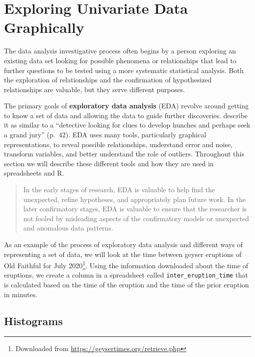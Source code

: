 \documentclass[
]{book}
\let\stdsection\section
\renewcommand\section{\newpage\stdsection}
\theoremstyle{definition}
\theoremstyle{definition}
\theoremstyle{definition}
\theoremstyle{definition}
\theoremstyle{remark}
\begin{document}
\hypertarget{exploring-univariate-data-graphically}{%
\section{Exploring Univariate Data Graphically}\label{exploring-univariate-data-graphically}}

The data analysis investigative process often begins by a person exploring an existing data set looking for possible phenomena or relationships that lead to further questions to be tested using a more systematic statistical analysis. Both the exploration of relationships and the confirmation of hypothesized relationships are valuable, but they serve different purposes.

The primary goals of \textbf{exploratory data analysis} (EDA) revolve around getting to know a set of data and allowing the data to guide further discoveries. \citet{EDA2003} describe it as similar to a ``detective looking for clues to develop hunches and perhaps seek a grand jury'' (p.~42). EDA uses many tools, particularly graphical representations, to reveal possible relationships, understand error and noise, transform variables, and better understand the role of outliers. Throughout this section we will describe these different tools and how they are used in spreadsheets and R.

\begin{quote}
In the early stages of research, EDA is valuable to help find the unexpected, refine hypotheses, and appropriately plan future work. In the later confirmatory stages, EDA is valuable to ensure that the researcher is not fooled by misleading aspects of the confirmatory models or unexpected and anomalous data patterns. \citep[p.~60]{EDA2003}
\end{quote}

As an example of the process of exploratory data analysis and different ways of representing a set of data, we will look at the time between geyser eruptions of Old Faithful for July 2020\footnote{Downloaded from \url{https://geysertimes.org/retrieve.php}}. Using the information downloaded about the time of eruptions, we create a column in a spreadsheet called \texttt{inter\_eruption\_time} that is calculated based on the time of the eruption and the time of the prior eruption in minutes.

\hypertarget{histograms}{%
\subsection{Histograms}\label{histograms}}
\end{document}
